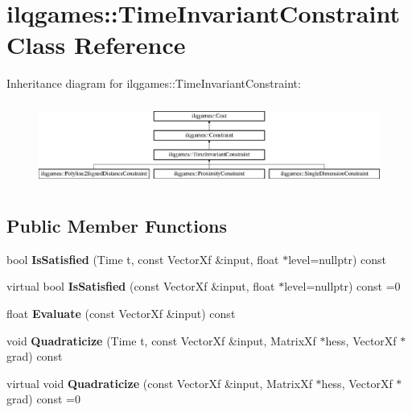 \hypertarget{classilqgames_1_1_time_invariant_constraint}{}\section{ilqgames\+:\+:Time\+Invariant\+Constraint Class Reference}
\label{classilqgames_1_1_time_invariant_constraint}
Inheritance diagram for ilqgames\+:\+:Time\+Invariant\+Constraint\+:\begin{figure}[H]
\begin{center}
\leavevmode
\includegraphics[height=2.755228cm]{classilqgames_1_1_time_invariant_constraint}
\end{center}
\end{figure}
\subsection*{Public Member Functions}
\begin{DoxyCompactItemize}
\item 
bool {\bfseries Is\+Satisfied} (Time t, const Vector\+Xf \&input, float $\ast$level=nullptr) const \hypertarget{classilqgames_1_1_time_invariant_constraint_aaae76d623a396948712806881aafceca}{}\label{classilqgames_1_1_time_invariant_constraint_aaae76d623a396948712806881aafceca}

\item 
virtual bool {\bfseries Is\+Satisfied} (const Vector\+Xf \&input, float $\ast$level=nullptr) const =0\hypertarget{classilqgames_1_1_time_invariant_constraint_ad5551cd9d070983f639c89c46ddff9e8}{}\label{classilqgames_1_1_time_invariant_constraint_ad5551cd9d070983f639c89c46ddff9e8}

\item 
float {\bfseries Evaluate} (const Vector\+Xf \&input) const \hypertarget{classilqgames_1_1_time_invariant_constraint_a2e1b3d7fbe55250677bfe61c394dd06f}{}\label{classilqgames_1_1_time_invariant_constraint_a2e1b3d7fbe55250677bfe61c394dd06f}

\item 
void {\bfseries Quadraticize} (Time t, const Vector\+Xf \&input, Matrix\+Xf $\ast$hess, Vector\+Xf $\ast$grad) const \hypertarget{classilqgames_1_1_time_invariant_constraint_ae8244c5a37225511e93a920126df8b7d}{}\label{classilqgames_1_1_time_invariant_constraint_ae8244c5a37225511e93a920126df8b7d}

\item 
virtual void {\bfseries Quadraticize} (const Vector\+Xf \&input, Matrix\+Xf $\ast$hess, Vector\+Xf $\ast$grad) const =0\hypertarget{classilqgames_1_1_time_invariant_constraint_a8ed31ed76064bf2a3a47e9f16be79d88}{}\label{classilqgames_1_1_time_invariant_constraint_a8ed31ed76064bf2a3a47e9f16be79d88}

\end{DoxyCompactItemize}
